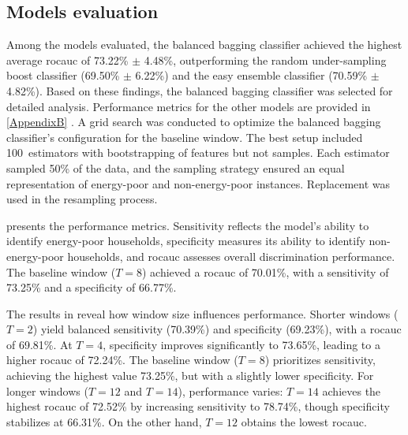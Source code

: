 \documentclass[preprint,authoryear,12pt]{elsarticle}
\begin{document}
\subsection{Models evaluation} \label{Models_evaluation}

Among the models evaluated, the balanced bagging classifier achieved the highest average \Gls{rocauc} of 73.22\% $\pm$ 4.48\%, outperforming the random under-sampling boost classifier (69.50\% $\pm$ 6.22\%) and the easy ensemble classifier (70.59\% $\pm$ 4.82\%). Based on these findings, the balanced bagging classifier was selected for detailed analysis. Performance metrics for the other models are provided in \ref{AppendixB} . A grid search was conducted to optimize the balanced bagging classifier’s configuration for the baseline window. The best setup included 100~estimators with bootstrapping of features but not samples. Each estimator sampled 50\% of the data, and the sampling strategy ensured an equal representation of energy-poor and non-energy-poor instances. Replacement was used in the resampling process.

 presents the performance metrics. Sensitivity reflects the model's ability to identify energy-poor households, specificity measures its ability to identify non-energy-poor households, and \Gls{rocauc} assesses overall discrimination performance. The baseline window ($T = 8$) achieved a \Gls{rocauc} of 70.01\%, with a sensitivity of 73.25\% and a specificity of 66.77\%.



The results in  reveal how window size influences performance. Shorter windows ($T = 2$) yield balanced sensitivity (70.39\%) and specificity (69.23\%), with a \Gls{rocauc} of 69.81\%. At $T = 4$, specificity improves significantly to 73.65\%, leading to a higher \Gls{rocauc} of 72.24\%. The baseline window ($T = 8$) prioritizes sensitivity, achieving the highest value 73.25\%, but with a slightly lower specificity. For longer windows ($T = 12$ and $T = 14$), performance varies: $T = 14$ achieves the highest \Gls{rocauc} of 72.52\% by increasing sensitivity to 78.74\%, though specificity stabilizes at 66.31\%. On the other hand, $T = 12$ obtains the lowest \Gls{rocauc}.
\end{document}
